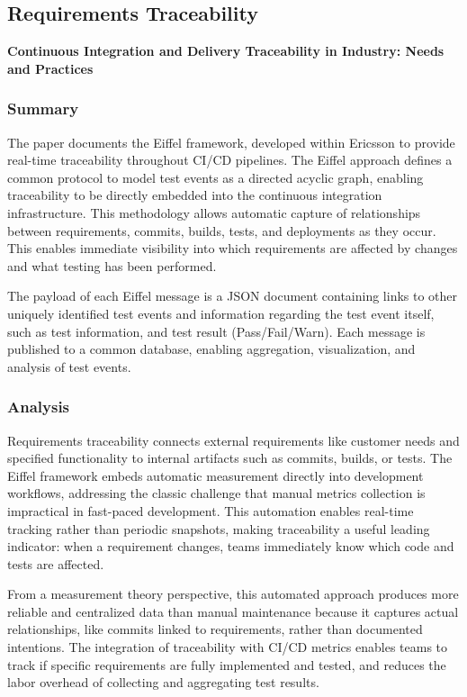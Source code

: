 \documentclass[12pt]{article}
\begin{document}
\subsection{Requirements Traceability}

\textbf{Continuous Integration and Delivery Traceability in
	Industry: Needs and Practices} \cite{stahl2016continuous}

\subsubsection{Summary}
The paper documents the Eiffel framework, developed within Ericsson to
provide real-time traceability throughout CI/CD pipelines.
The Eiffel approach defines a common protocol to model test events as a
directed acyclic graph, enabling traceability to be directly embedded into
the continuous integration infrastructure. This methodology allows automatic
capture of relationships between requirements, commits, builds, tests,
and deployments as they occur. This enables immediate visibility into
which requirements are affected by changes and what testing has
been performed.

The payload of each Eiffel message is a JSON document containing
links to other uniquely identified test events and information regarding the
test event itself, such as test information, and test result (Pass/Fail/Warn).
Each message is published to a common database, enabling aggregation, visualization,
and analysis of test events.

\subsubsection{Analysis}
Requirements traceability
connects external requirements like customer needs and specified
functionality to internal artifacts such as commits, builds, or tests. The Eiffel framework
embeds automatic measurement directly into development
workflows, addressing the classic challenge that manual metrics
collection is impractical in fast-paced development. This automation
enables real-time tracking rather than periodic snapshots, making
traceability a useful leading indicator: when a requirement changes,
teams immediately know which code and tests are affected.

From a
measurement theory perspective, this automated approach produces more
reliable and centralized data than manual maintenance because it captures actual
relationships, like commits linked to requirements, rather than documented
intentions. The integration of traceability with CI/CD metrics enables
teams to track if specific requirements are fully
implemented and tested, and reduces the labor overhead of collecting and aggregating
test results.
\end{document}
